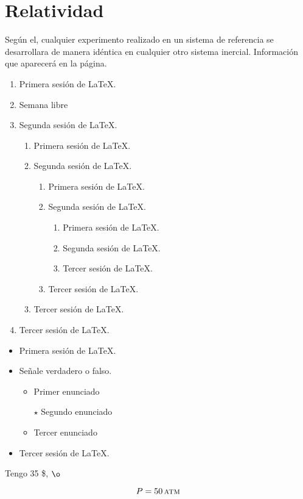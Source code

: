 \documentclass[12pt,a4paper]{article}
\begin{document}
\section{Relatividad}
Según el, cualquier experimento realizado en un sistema de {\sc referencia}  se desarrollara de manera idéntica en cualquier otro sistema inercial. Información que aparecerá en la página.\begin{enumerate}
\item Primera sesión de \LaTeX.
\item Semana libre
\item Segunda sesión de \LaTeX.\begin{enumerate}
	\item Primera sesión de \LaTeX.
	\item Segunda sesión de \LaTeX.\begin{enumerate}
	\item Primera sesión de \LaTeX.
	\item Segunda sesión de \LaTeX.\begin{enumerate}
	\item Primera sesión de \LaTeX.
	\item Segunda sesión de \LaTeX.
	\item Tercer sesión de \LaTeX.
\end{enumerate}
	\item Tercer sesión de \LaTeX.
\end{enumerate}
	\item Tercer sesión de \LaTeX.
\end{enumerate}
\item Tercer sesión de \LaTeX.
\end{enumerate}

\begin{itemize}
	\item Primera sesión de \LaTeX.
	\item Señale verdadero o falso.\begin{itemize}
	\item Primer enunciado
	\item[$\star$] Segundo enunciado
	\item Tercer enunciado
	\end{itemize}
	\item Tercer sesión de \LaTeX.
\end{itemize}

Tengo 35 \$, $\o$
 
$$P=50\,\textsc{atm}$$
\end{document}
